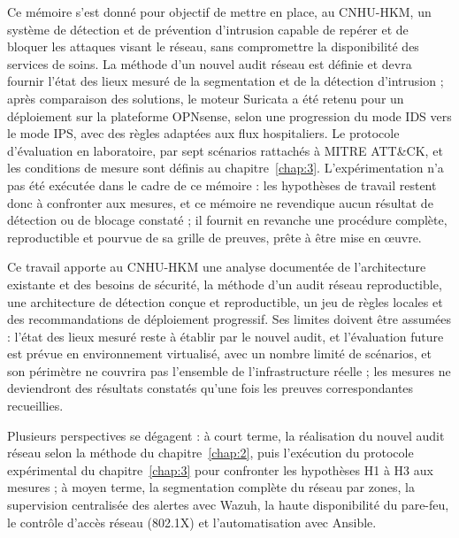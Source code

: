 \conclusion

Ce mémoire s'est donné pour objectif de mettre en place, au CNHU-HKM, un système de détection et de prévention d'intrusion capable de repérer et de bloquer les attaques visant le réseau, sans compromettre la disponibilité des services de soins. La méthode d'un nouvel audit réseau est définie et devra fournir l'état des lieux mesuré de la segmentation et de la détection d'intrusion ; après comparaison des solutions, le moteur Suricata a été retenu pour un déploiement sur la plateforme OPNsense, selon une progression du mode IDS vers le mode IPS, avec des règles adaptées aux flux hospitaliers. Le protocole d'évaluation en laboratoire, par sept scénarios rattachés à MITRE ATT\&CK, et les conditions de mesure sont définis au chapitre~\ref{chap:3}. L'expérimentation n'a pas été exécutée dans le cadre de ce mémoire : les hypothèses de travail restent donc à confronter aux mesures, et ce mémoire ne revendique aucun résultat de détection ou de blocage constaté ; il fournit en revanche une procédure complète, reproductible et pourvue de sa grille de preuves, prête à être mise en œuvre.

Ce travail apporte au CNHU-HKM une analyse documentée de l'architecture existante et des besoins de sécurité, la méthode d'un audit réseau reproductible, une architecture de détection conçue et reproductible, un jeu de règles locales et des recommandations de déploiement progressif. Ses limites doivent être assumées : l'état des lieux mesuré reste à établir par le nouvel audit, et l'évaluation future est prévue en environnement virtualisé, avec un nombre limité de scénarios, et son périmètre ne couvrira pas l'ensemble de l'infrastructure réelle ; les mesures ne deviendront des résultats constatés qu'une fois les preuves correspondantes recueillies.

Plusieurs perspectives se dégagent : à court terme, la réalisation du nouvel audit réseau selon la méthode du chapitre~\ref{chap:2}, puis l'exécution du protocole expérimental du chapitre~\ref{chap:3} pour confronter les hypothèses H1 à H3 aux mesures ; à moyen terme, la segmentation complète du réseau par zones, la supervision centralisée des alertes avec Wazuh, la haute disponibilité du pare-feu, le contrôle d'accès réseau (802.1X) et l'automatisation avec Ansible.
